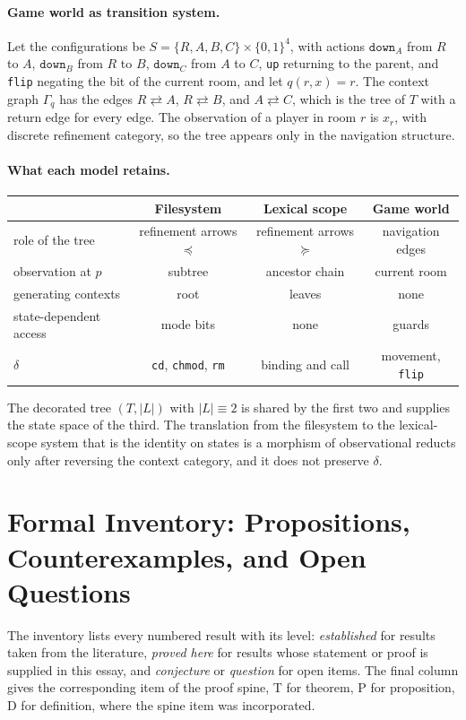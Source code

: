 \documentclass[11pt]{article}
\theoremstyle{definition}
\theoremstyle{remark}
\begin{document}
\paragraph{Game world as transition system.} Let the configurations be $S=\{R,A,B,C\}\times\{0,1\}^4$, with actions $\texttt{down}_A$ from $R$ to $A$, $\texttt{down}_B$ from $R$ to $B$, $\texttt{down}_C$ from $A$ to $C$, \texttt{up} returning to the parent, and \texttt{flip} negating the bit of the current room, and let $q(r,x)=r$. The context graph $\Gamma_q$ has the edges $R\rightleftarrows A$, $R\rightleftarrows B$, and $A\rightleftarrows C$, which is the tree of $T$ with a return edge for every edge. The observation of a player in room $r$ is $x_r$, with discrete refinement category, so the tree appears only in the navigation structure.

\paragraph{What each model retains.}
\begin{center}
\begin{tabular}{lccc}
\toprule
 & Filesystem & Lexical scope & Game world\\
\midrule
role of the tree & refinement arrows $\preceq$ & refinement arrows $\succeq$ & navigation edges\\
observation at $p$ & subtree & ancestor chain & current room\\
generating contexts & root & leaves & none\\
state-dependent access & mode bits & none & guards\\
$\delta$ & \texttt{cd}, \texttt{chmod}, \texttt{rm} & binding and call & movement, \texttt{flip}\\
\bottomrule
\end{tabular}
\end{center}
The decorated tree $(T,|L|)$ with $|L|\equiv2$ is shared by the first two and supplies the state space of the third. The translation from the filesystem to the lexical-scope system that is the identity on states is a morphism of observational reducts only after reversing the context category, and it does not preserve $\delta$.

\section{Formal Inventory: Propositions, Counterexamples, and Open Questions}

The inventory lists every numbered result with its level: \emph{established} for results taken from the literature, \emph{proved here} for results whose statement or proof is supplied in this essay, and \emph{conjecture} or \emph{question} for open items. The final column gives the corresponding item of the proof spine, T for theorem, P for proposition, D for definition, where the spine item was incorporated.
\end{document}
